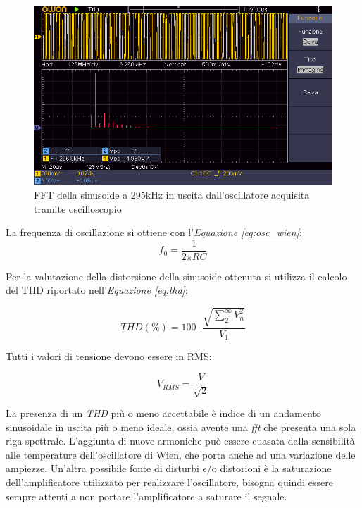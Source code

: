 \documentclass[titlepage]{report}
\begin{document}
	\begin{figure}[H]
		\centering
		\includegraphics[scale=0.9]{Immagini/009_OscillatoreWienFFT.png}
		\caption{FFT della sinusoide a 295kHz in uscita dall'oscillatore acquisita tramite oscilloscopio}
		\label{fig:FFT295k}
	\end{figure}
	
	\noindent La frequenza di oscillazione si ottiene con l'\textit{Equazione \ref{eq:osc_wien}}:
	\begin{equation}
		\label{eq:osc_wien}
		f_0 = \frac{1}{2\pi RC}
	\end{equation}
	
	\noindent Per la valutazione della distorsione della sinusoide ottenuta si utilizza il calcolo del THD riportato nell'\textit{Equazione \ref{eq:thd}}:
	
	\begin{equation}
		\label{eq:thd}
		THD (\%) = 100 \cdot \frac{\sqrt{\sum_{2}^{\infty} V_{n}^2}}{V_1}
	\end{equation}

	\noindent Tutti i valori di tensione devono essere in RMS: 
	
	\begin{equation}
		\label{eq:Vrms}
		V_{RMS} = \frac{V}{\sqrt{2}}
	\end{equation}

	\noindent La presenza di un \textit{THD} più o meno accettabile è indice di un andamento sinusoidale in uscita più o meno ideale, ossia avente una \textit{fft} che presenta una sola riga spettrale. L'aggiunta di nuove armoniche può essere cuasata dalla sensibilità alle temperature dell'oscillatore di Wien, che porta anche ad una variazione delle ampiezze. Un'altra possibile fonte di disturbi e/o distorioni è la saturazione dell'amplificatore utilizzato per realizzare l'oscillatore, bisogna quindi essere sempre attenti a non portare l'amplificatore a saturare il segnale.
\end{document}
